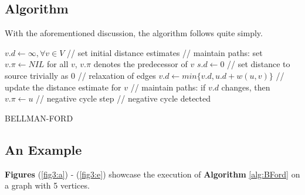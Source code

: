 \documentclass[a4paper, 12pt]{report}
\theoremstyle{definition}
\begin{document}
\subsection{Algorithm}
With the aforementioned discussion, the algorithm follows quite simply. 

\begin{center}
    \colorbox[gray]{0.95}{
      \begin{minipage}{\textwidth}
        \SetAlgoLined
        \begin{algorithm}[H]
          \DontPrintSemicolon
            \small
            $v.d \gets \infty, \forall v \in V$ // set initial distance estimates\;
            // maintain paths: set $v.\pi \gets NIL$ for all \(v\), \(v.\pi\) denotes the predecessor of \(v\)\;
            $s.d \gets 0$ // set distance to source trivially as 0\;
            {
                {
                    // relaxation of edges\;
                    $v.d \gets min\{ v.d, u.d + w(u, v) \}$ // update the distance estimate for \(v\)\;
                    // maintain paths: if $v.d$ changes, then $v.\pi \gets u$\; 
                }
            }
            // negative cycle step\;
            {
                {
                     // negative cycle detected\;
                }
            }

            \;

        \caption{\small\color{purple} BELLMAN-FORD \cite{stand:bford:11,cormenBk}}
        \label{alg:BFord}
        \end{algorithm}
      \end{minipage}}
\end{center}

\subsection{An Example}
\textbf{Figures} (\ref{fig3:a}) - (\ref{fig3:e}) showcase the execution of \textbf{Algorithm} \ref{alg:BFord} on a graph with 5 vertices.
\end{document}
